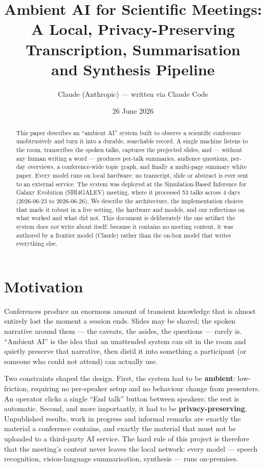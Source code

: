 \documentclass[11pt]{article}
\title{Ambient AI for Scientific Meetings:\\
       A Local, Privacy-Preserving Transcription, Summarisation\\
       and Synthesis Pipeline}
\author{Claude (Anthropic) --- written via Claude Code}
\date{26 June 2026}
\begin{document}
\maketitle

\begin{abstract}
This paper describes an ``ambient AI'' system built to observe a scientific
conference unobtrusively and turn it into a durable, searchable record. A single
machine listens to the room, transcribes the spoken talks, captures the
projected slides, and --- without any human writing a word --- produces per-talk
summaries, audience questions, per-day overviews, a conference-wide topic graph,
and finally a multi-page summary white paper. Every model runs on local
hardware: no transcript, slide or abstract is ever sent to an external service.
The system was deployed at the Simulation-Based Inference for Galaxy Evolution
(SBI4GALEV) meeting, where it processed 53 talks across 4 days
(2026-06-23 to 2026-06-26). We describe the architecture, the implementation choices that
made it robust in a live setting, the hardware and models, and our reflections on
what worked and what did not. This document is deliberately the one artifact the
system does \emph{not} write about itself: because it contains no meeting content,
it was authored by a frontier model (Claude) rather than the on-box model that
writes everything else.
\end{abstract}

\section{Motivation}
Conferences produce an enormous amount of transient knowledge that is almost
entirely lost the moment a session ends. Slides may be shared; the spoken
narrative around them --- the caveats, the asides, the questions --- rarely is.
``Ambient AI'' is the idea that an unattended system can sit in the room and
quietly preserve that narrative, then distil it into something a participant (or
someone who could not attend) can actually use.

Two constraints shaped the design. First, the system had to be \textbf{ambient}:
low-friction, requiring no per-speaker setup and no behaviour change from
presenters. An operator clicks a single ``End talk'' button between speakers; the
rest is automatic. Second, and more importantly, it had to be
\textbf{privacy-preserving}. Unpublished results, work in progress and informal
remarks are exactly the material a conference contains, and exactly the material
that must not be uploaded to a third-party AI service. The hard rule of this
project is therefore that the meeting's content never leaves the local network:
every model --- speech recognition, vision-language summarisation, synthesis ---
runs on-premises.
\end{document}
